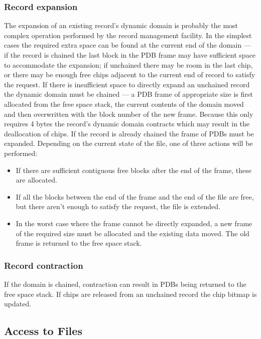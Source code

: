 \subsubsection {Record expansion}

The expansion of an existing record's dynamic domain is probably the most
complex operation performed by the record management facility. In the simplest
cases the required extra space can be found at the current end of the domain
--- if the record is chained the last block in the PDB frame may have
sufficient space to accommodate the expansion; if unchained there may be room
in the last chip, or there may be enough free chips adjacent to the current end
of record to satisfy the request. If there is insufficient space to directly
expand an unchained record the dynamic domain must be chained --- a PDB frame
of appropriate size is first allocated from the free space stack, the current
contents of the domain moved and then overwritten with the block number of the
new frame. Because this only requires 4 bytes the record's dynamic domain
contracts which may result in the deallocation of chips. If the record is
already chained the frame of PDBs must be expanded. Depending on the current
state of the file, one of three actions will be performed: 

\begin {itemize}
\item If there are sufficient contiguous free blocks after the end of the frame,
these are allocated.
\item If all the blocks between the end of the frame and the end of the file are
free, but there aren't enough to satisfy the request, the file is extended.
\item In the worst case where the frame cannot be directly expanded, a new frame
of the required size must be allocated and the existing data moved.
The old frame is returned to the free space stack.
\end {itemize}

\subsubsection {Record contraction}

If the domain is chained, contraction can result in PDBs being returned to the
free space stack. If chips are released from an unchained record the chip
bitmap is updated. 

\subsection {Access to Files}
\label {access_to_files}

